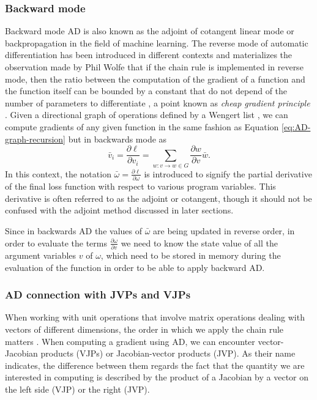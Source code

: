 \subsubsection{Backward mode}

Backward mode AD is also known as the adjoint of cotangent linear mode or backpropagation in the field of machine learning. 
The reverse mode of automatic differentiation has been introduced in different contexts \cite{griewank2012invented} and materializes the observation made by Phil Wolfe that if the chain rule is implemented in reverse mode, then the ratio between the computation of the gradient of a function and the function itself can be bounded by a constant that do not depend of the number of parameters to differentiate \cite{Griewack-on-AD, Wolfe_1982}, a point known as \textit{cheap gradient principle} \cite{griewank2012invented}.  
Given a directional graph of operations defined by a Wengert list \cite{Wengert_1964}, we can compute gradients of any given function in the same fashion as Equation \eqref{eq:AD-graph-recursion} but in backwards mode as
\begin{equation}
 \bar v_i = \frac{\partial \ell}{\partial v_i}= \sum_{w : v \rightarrow w \in G} \frac{\partial w}{\partial v} \bar{w}.
\end{equation}
In this context, the notation $\bar{\omega} = \frac{\partial \ell}{\partial \omega}$ is introduced to signify the partial derivative of the final loss function with respect to various program variables. This derivative is often referred to as the adjoint or cotangent, though it should not be confused with the adjoint method discussed in later sections.


Since in backwards AD the values of $\bar \omega$ are being updated in reverse order, in order to evaluate the terms $\frac{\partial \omega}{\partial v}$ we need to know the state value of all the argument variables $v$ of $\omega$, which need to be stored in memory during the evaluation of the function in order to be able to apply backward AD.


\subsubsection{AD connection with JVPs and VJPs}

When working with unit operations that involve matrix operations dealing with vectors of different dimensions, the order in which we apply the chain rule matters \cite{Giering_Kaminski_1998}.
When computing a gradient using AD, we can encounter vector-Jacobian products (VJPs) or Jacobian-vector products (JVP).
As their name indicates, the difference between them regards the fact that the quantity we are interested in computing is described by the product of a Jacobian by a vector on the left side (VJP) or the right (JVP).

